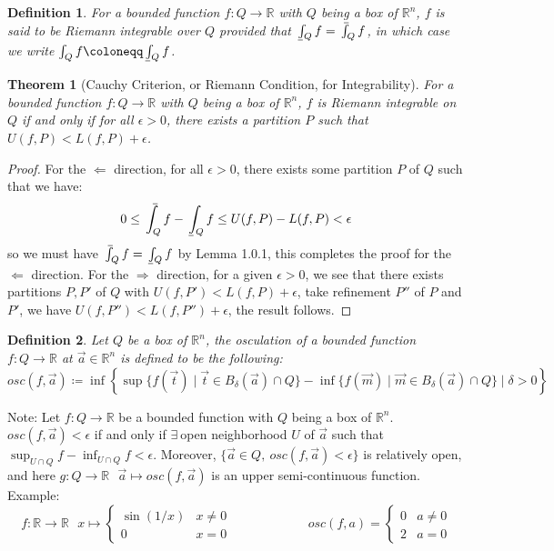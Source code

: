 \documentclass[15pt]{book}
\theoremstyle{break}
\theoremstyle{break}
\newtheorem{thm}{Theorem}[section]
\newtheorem{defn}{Definition}[corL]
\def\upint{\mathchoice%
    {\mkern13mu\overline{\vphantom{\intop}\mkern7mu}\mkern-20mu}%
    {\mkern7mu\overline{\vphantom{\intop}\mkern7mu}\mkern-14mu}%
    {\mkern7mu\overline{\vphantom{\intop}\mkern7mu}\mkern-14mu}%
    {\mkern7mu\overline{\vphantom{\intop}\mkern7mu}\mkern-14mu}%
  \int}
\def\lowint{\mkern3mu\underline{\vphantom{\intop}\mkern7mu}\mkern-10mu\int}
\newcommand{\R}{\mathbb{R}}
\newcommand{\note}{\color{red}Note: \color{black}}
\newcommand{\example}{\color{green}Example: \color{black}}
\begin{document}
\begin{defn}
For a bounded function $f:Q \to \R$ with $Q$ being a box of $\R^n$, $f$ is said to be Riemann integrable over $Q$ provided that $\lowint_Q f = \upint_Q f$, in which case we write $\int_Q f \coloneqq \lowint_Q f$.
\end{defn}

\begin{thm}[Cauchy Criterion, or Riemann Condition, for Integrability]
For a bounded function $f:Q \to \R$ with $Q$ being a box of $\R^n$, $f$ is Riemann integrable on $Q$ if and only if for all $\epsilon>0$, there exists a partition $P$ such that $U(f,P) < L(f,P) + \epsilon$.
\end{thm}
\begin{proof}
For the $\Leftarrow$ direction, for all $\epsilon>0$, there exists some partition $P$ of $Q$ such that we have:
$$0 \leq \upint_Q f - \lowint_Q f \leq U(f,P) - L(f,P) < \epsilon$$
so we must have $\upint_Q f = \lowint_Q f $ by Lemma 1.0.1, this completes the proof for the $\Leftarrow$ direction. For the $\Rightarrow$ direction, for a given $\epsilon >0$, we see that there exists partitions $P,P'$ of $Q$ with $U(f,P') < L(f,P)+\epsilon$, take refinement $P''$ of $P$ and $P'$, we have $U(f,P'') < L(f,P'')+\epsilon$, the result follows.
\end{proof}


\begin{defn}
Let $Q $ be a box of $\R^n$, the osculation of a bounded function $f:Q \to \R$ at $\vec{a}\in \R^n$ is defined to be the following: 
$$osc(f,\vec{a}) \coloneqq \inf\left\{ \sup\{ f(\vec{t})\mid \vec{t} \in B_\delta(\vec{a})\cap Q\}  - \inf\{ f(\vec{m})\mid \vec{m} \in B_\delta(\vec{a})\cap Q\}  \mid {\delta>0} \right\} $$
\end{defn}

\note Let $f:Q \to \R$ be a bounded function with $Q$ being a box of $\R^n$. $osc(f,\vec{a}) < \epsilon$ if and only if $\exists\ $open neighborhood $U$ of $\vec{a}$ such that $\sup_{U\cap Q} f - \inf_{U\cap Q} f < \epsilon$. Moreover, $\{ \vec{a} \in Q,\ osc(f,\vec{a})<\epsilon\}$ is relatively open, and here $g:Q \to \R \ \ \ \vec{a}\mapsto osc(f,\vec{a})$ is an upper semi-continuous function.\\

\example
$$f: \R \to \R \ \ \ x\mapsto\begin{cases} \sin(1/x) & x \neq 0 \\ 0 & x = 0\end{cases} \qquad\qquad\qquad osc(f,a) = \begin{cases} 0 & a \neq 0 \\ 2 & a = 0 \end{cases}$$
\end{document}
